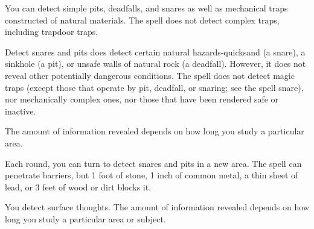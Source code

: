 \begin{multicols}{2}
\begin{small}
\noindent You can detect simple pits, deadfalls, and snares as well as mechanical traps constructed of natural materials. The spell does not detect complex traps, including trapdoor traps.

\smallskip\noindent Detect snares and pits does detect certain natural hazards-quicksand (a snare), a sinkhole (a pit), or unsafe walls of natural rock (a deadfall). However, it does not reveal other potentially dangerous conditions. The spell does not detect magic traps (except those that operate by pit, deadfall, or snaring; see the spell snare), nor mechanically complex ones, nor those that have been rendered safe or inactive.

\smallskip\noindent The amount of information revealed depends on how long you study a particular area.


\smallskip\noindent Each round, you can turn to detect snares and pits in a new area. The spell can penetrate barriers, but 1 foot of stone, 1 inch of common metal, a thin sheet of lead, or 3 feet of wood or dirt blocks it.

\noindent You detect surface thoughts. The amount of information revealed depends on how long you study a particular area or subject.


\end{small}
\end{multicols}
